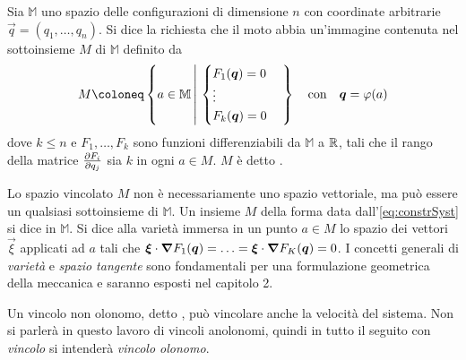\begin{definition} \label{def:constrainedConfigSpace}
  Sia $\mathbb{M}$ uno spazio delle configurazioni di dimensione $n$ con coordinate arbitrarie $\vec{q} = (q_1, \ldots, q_n)$. Si dice  la richiesta che il moto abbia un'immagine contenuta nel sottoinsieme $M$ di $\mathbb{M}$ definito da \begin{equation}
    \label{eq:constrSyst}
    M \defeq \left\{ a \in \mathbb{M} \left|\ \begin{cases} 
      F_1(\vec{q}) = 0 \\
      \vdots \\
      F_k(\vec{q}) = 0
    \end{cases} \right. \right\} \qqtext{con} \vec{q} = \phi(a)
  \end{equation} 
  dove $k \le n$ e $F_1, \ldots, F_k$ sono funzioni differenziabili da $\mathbb{M}$ a $\mathbb{R}$, tali che il rango della matrice $\pdv{F_i}{q_j}(a)$ sia $k$ in ogni $a \in M$. $M$ è detto .
\end{definition}
\begin{remark}
  Lo spazio vincolato $M$ non è necessariamente uno spazio vettoriale, ma può essere un qualsiasi sottoinsieme di $\mathbb{M}$. Un insieme $M$ della forma data dall'\autoref{eq:constrSyst} si dice  in $\mathbb{M}$. Si dice  alla varietà immersa in un punto $a \in M$ lo spazio dei vettori $\vec{\xi}$ applicati ad $a$ tali che $\boldsymbol{\xi} \cdot \grad{F_1}(\boldsymbol{q}) = \ldots = \boldsymbol{\xi} \cdot \grad{F_K}(\boldsymbol{q}) = 0$. I concetti generali di \emph{varietà} e \emph{spazio tangente} sono fondamentali per una formulazione geometrica della meccanica e saranno esposti nel capitolo 2.
\end{remark}
\begin{remark}
  Un vincolo non olonomo, detto , può vincolare anche la velocità del sistema. Non si parlerà in questo lavoro di vincoli anolonomi, quindi in tutto il seguito con \emph{vincolo} si intenderà \emph{vincolo olonomo}.
\end{remark}

